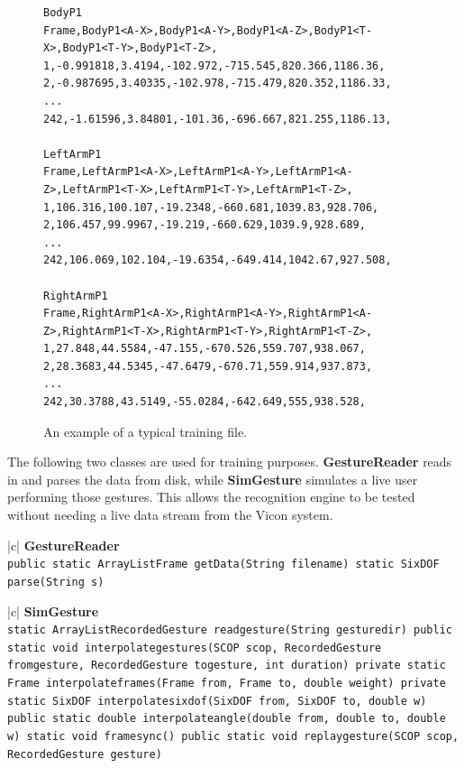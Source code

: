 \documentclass[12pt,a4,notitlepage]{report}
\renewcommand{\_}{\texttt{\symbol{95}}}
\newcommand{\<}{\texttt{\symbol{60}}}
\renewcommand{\>}{\texttt{\symbol{62}}}
\newcommand{\class}[1]{\textbf{#1}}
\newcommand{\variable}[1]{\texttt{#1}}
\begin{document}
\begin{figure}
\centering
{\scriptsize
\begin{verbatim}
BodyP1
Frame,BodyP1<A-X>,BodyP1<A-Y>,BodyP1<A-Z>,BodyP1<T-X>,BodyP1<T-Y>,BodyP1<T-Z>,
1,-0.991818,3.4194,-102.972,-715.545,820.366,1186.36,
2,-0.987695,3.40335,-102.978,-715.479,820.352,1186.33,
...
242,-1.61596,3.84801,-101.36,-696.667,821.255,1186.13,

LeftArmP1
Frame,LeftArmP1<A-X>,LeftArmP1<A-Y>,LeftArmP1<A-Z>,LeftArmP1<T-X>,LeftArmP1<T-Y>,LeftArmP1<T-Z>,
1,106.316,100.107,-19.2348,-660.681,1039.83,928.706,
2,106.457,99.9967,-19.219,-660.629,1039.9,928.689,
...
242,106.069,102.104,-19.6354,-649.414,1042.67,927.508,

RightArmP1
Frame,RightArmP1<A-X>,RightArmP1<A-Y>,RightArmP1<A-Z>,RightArmP1<T-X>,RightArmP1<T-Y>,RightArmP1<T-Z>,
1,27.848,44.5584,-47.155,-670.526,559.707,938.067,
2,28.3683,44.5345,-47.6479,-670.71,559.914,937.873,
...
242,30.3788,43.5149,-55.0284,-642.649,555,938.528,
\end{verbatim}
}
\caption{An example of a typical training file.}
\label{trainingfile}
\end{figure}

The following two classes are used for training purposes. \class{GestureReader} reads in and parses the data from disk, while \class{SimGesture} simulates a live user performing those gestures. This allows the recognition engine to be tested without needing a live data stream from the Vicon system.

\begin{tabular}{|c|} \hline 
\class{GestureReader} \\ \hline
{}
{ \variable{public static ArrayList\<Frame\> getData(String filename) \newline
static SixDOF parse(String s)
} } \\ \hline
\end{tabular}

\begin{tabular}{|c|} \hline 
\class{SimGesture} \\ \hline
{}
{ \variable{static ArrayList\<RecordedGesture\> read\_gesture(String gesture\_dir) \newline
public static void interpolate\_gestures(SCOP scop, RecordedGesture from\_gesture, RecordedGesture to\_gesture, int duration) \newline
private static Frame interpolate\_frames(Frame from, Frame to, double weight) \newline
private static SixDOF interpolate\_sixdof(SixDOF from, SixDOF to, double w) \newline
public static double interpolate\_angle(double from, double to, double w) \newline
static void framesync() \newline
public static void replay\_gesture(SCOP scop, RecordedGesture gesture)
} } \\ \hline
\end{tabular}
\end{document}
